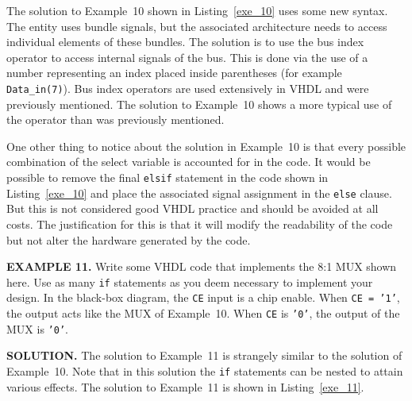 The solution to Example~10 shown in Listing~\ref{exe_10} uses some new syntax. The entity uses bundle signals, but the associated architecture needs to access individual elements of these bundles. The solution is to use the bus index operator to access internal signals of the bus. This is done via the use of a number representing an index placed inside parentheses (for example \texttt{Data\_in(7)}). Bus index operators are used extensively in VHDL and were previously mentioned. The solution to Example~10 shows a more typical use of the operator than was previously mentioned.

One other thing to notice about the solution in Example~10 is that every possible combination of the select variable is accounted for in the code. It would be possible to remove the final \texttt{elsif} statement in the code shown in Listing~\ref{exe_10} and place the associated signal assignment in the \texttt{else} clause. But this is not considered good VHDL practice and should be avoided at all costs. The justification for this is that it will modify the readability of the code but not alter the hardware generated by the code.

\begin{leftbar}
\noindent
\begin{minipage}{0.52\linewidth}
\textbf{EXAMPLE 11.}
Write some VHDL code that implements the 8:1 MUX shown here. Use as many \texttt{if} statements as you deem necessary to implement your design. In the black-box diagram, the  \texttt{CE} input is a chip enable. When \texttt{CE = '1'}, the output acts like the  MUX of Example~10. When  \texttt{CE} is  \texttt{'0'}, the output of the MUX is  \texttt{'0'}.
\end{minipage}
\begin{minipage}{0.45\linewidth}
\begin{flushright}
\end{flushright}
\end{minipage}
\end{leftbar}
\noindent
\textbf{SOLUTION.} The solution to Example~11 is strangely similar to the solution of Example~10. Note that in this solution the \texttt{if} statements can be nested to attain various effects. The solution to Example~11 is shown in Listing~\ref{exe_11}.

